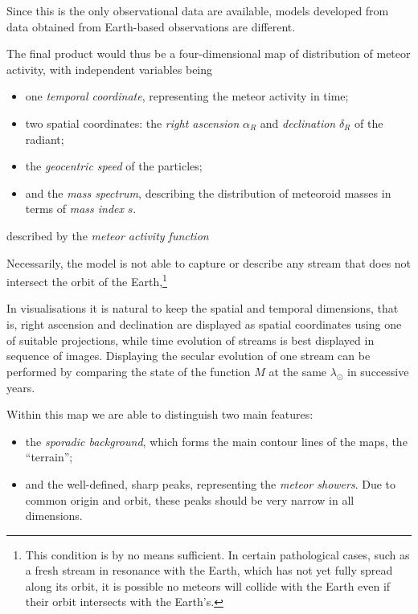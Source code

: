     Since this is the only observational data are available,
    models developed from data obtained from Earth-based observations are different.

    The final product would thus be a four-dimensional map of distribution of meteor activity, with independent variables being
    \begin{itemize}
        \item one \emph{temporal coordinate}, representing the meteor activity in time;
        \item two spatial coordinates: the \emph{right ascension} $\alpha_R$ and \emph{declination} $\delta_R$ of the radiant;
        \item the \emph{geocentric speed} of the particles;
        \item and the \emph{mass spectrum}, describing the distribution of meteoroid masses in terms of \textit{mass index} $s$.
    \end{itemize}

    described by the \emph{meteor activity function}

    Necessarily, the model is not able to capture or describe any stream that does not intersect the orbit of the
    Earth,\footnote{This condition is by no means sufficient. In certain pathological cases, such as a fresh stream in resonance
    with the Earth, which has not yet fully spread along its orbit, it is possible no meteors will collide with the Earth even
    if their orbit intersects with the Earth's.}

    In visualisations it is natural to keep the spatial and temporal dimensions, that is, right ascension and declination are
    displayed as spatial coordinates using one of suitable projections, while time evolution of streams is best displayed
    in sequence of images.
    Displaying the secular evolution of one stream can be performed by comparing the state of the function $M$ at
    the same $\lambda_\odot$ in successive years.

    \citep{balaz+2020}

    Within this map we are able to distinguish two main features:
    \begin{itemize}
        \item the \emph{sporadic background}, which forms the main contour lines of the maps, the ``terrain'';
        \item and the well-defined, sharp peaks, representing the \emph{meteor showers}. Due to common origin and orbit,
            these peaks should be very narrow in all dimensions.
    \end{itemize}

